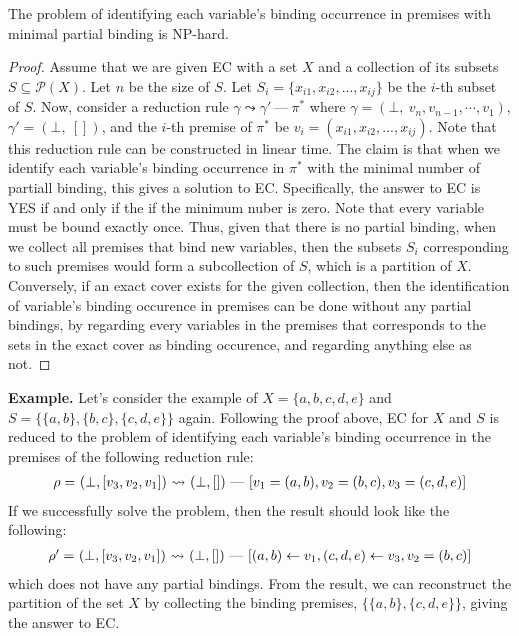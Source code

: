 \begin{theorem}\label{thm:np-hard}
The problem of identifying each variable's binding occurrence in premises with minimal partial binding is NP-hard.
\end{theorem}
\begin{proof}
Assume that we are given EC with a set $X$ and
a collection of its subsets $S \subseteq \mathcal{P}(X)$. Let $n$ be the size of $S$.
Let $S_i = \{x_{i1}, x_{i2}, ..., x_{ij}\}$ be the $i$-th subset of $S$.
Now, consider a reduction rule $\gamma \leadsto \gamma'\ \mbox{---}\ \pi^*$
where $\gamma = (\bot,\ v_n, v_{n-1}, \cdots, v_1)$,
$\gamma' = (\bot,\ [])$, and
the $i$-th premise of $\pi^*$ be $v_i = (x_{i1}, x_{i2}, ..., x_{ij})$.
Note that this reduction rule can be constructed in linear time.
The claim is that when we identify each variable's binding occurrence in $\pi^*$
with the minimal number of partiall binding,
this gives a solution to EC.
Specifically, the answer to EC is YES if and only if the if the minimum nuber is zero.
Note that every variable must be bound exactly once.
Thus, given that there is no partial binding,
when we collect all premises that bind new variables,
then the subsets $S_i$ corresponding to such premises
would form a subcollection of $S$, which is a partition of $X$.
Conversely, if an exact cover exists for the given collection, then the
identification of variable's binding occurence in premises can be done
without any partial bindings, by regarding every variables in the
premises that corresponds to the sets in the exact cover as binding
occurence, and regarding anything else as not.
\end{proof}

\textbf{Example.}
Let's consider the example of $X = \{a, b, c, d, e\}$ and $S = \{\{a,b\}, \{b,c\}, \{c,d,e\}\}$ again.
Following the proof above, EC for $X$ and $S$ is reduced to the problem of
identifying each variable's binding occurrence in the premises of the
following reduction rule:
\[
\begin{array}{l@{~}l@{~}c@{~}l}
\rho = & (\bot, [v_3, v_2, v_1]) &\leadsto& (\bot, [])\ \mbox{---}\
[v_1 = (a,b), v_2 = (b,c), v_3 = (c, d, e)]
\end{array}
 \]
If we successfully solve the problem, then the result should look like the following:
\[
\begin{array}{l@{~}l@{~}c@{~}l}
\rho' = & (\bot, [v_3, v_2, v_1]) &\leadsto& (\bot, [])\ \mbox{---}\
[(a,b) \leftarrow v_1, (c, d, e) \leftarrow v_3, v_2 = (b,c)]
\end{array}
\]
which does not have any partial bindings. From the result, we can reconstruct the partition of the set $X$
by collecting the binding premises, $\{\{a, b\}, \{c, d, e\}\}$, giving the answer to EC.

